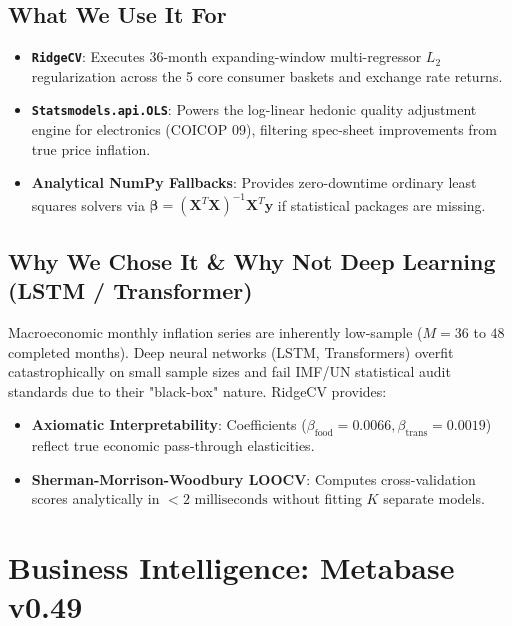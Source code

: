 \documentclass[a4paper, 11pt]{article}
\begin{document}
\subsection{What We Use It For}
\begin{itemize}[leftmargin=*]
    \item \textbf{\texttt{RidgeCV}}: Executes 36-month expanding-window multi-regressor $L_2$ regularization across the 5 core consumer baskets and exchange rate returns.
    \item \textbf{\texttt{Statsmodels.api.OLS}}: Powers the log-linear hedonic quality adjustment engine for electronics (COICOP 09), filtering spec-sheet improvements from true price inflation.
    \item \textbf{Analytical NumPy Fallbacks}: Provides zero-downtime ordinary least squares solvers via $\mathbf{\beta} = (\mathbf{X}^T \mathbf{X})^{-1} \mathbf{X}^T \mathbf{y}$ if statistical packages are missing.
\end{itemize}

\subsection{Why We Chose It \& Why Not Deep Learning (LSTM / Transformer)}
Macroeconomic monthly inflation series are inherently low-sample ($M = 36$ to $48$ completed months). Deep neural networks (LSTM, Transformers) overfit catastrophically on small sample sizes and fail IMF/UN statistical audit standards due to their "black-box" nature. RidgeCV provides:
\begin{itemize}[leftmargin=*]
    \item \textbf{Axiomatic Interpretability}: Coefficients ($\beta_{\text{food}} = 0.0066, \beta_{\text{trans}} = 0.0019$) reflect true economic pass-through elasticities.
    \item \textbf{Sherman-Morrison-Woodbury LOOCV}: Computes cross-validation scores analytically in $<2\text{ milliseconds}$ without fitting $K$ separate models.
\end{itemize}

\newpage
\section{Business Intelligence: Metabase v0.49}
\end{document}
